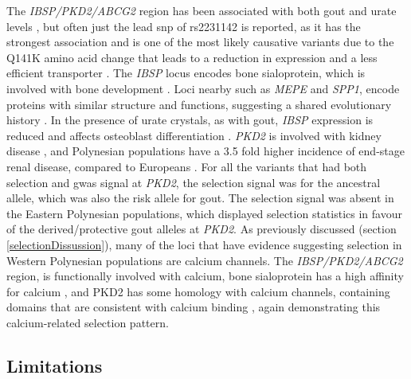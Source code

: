 \documentclass[twoside,openright]{report}
\begin{document}
The \emph{IBSP/PKD2/ABCG2} region has been associated with both gout and
urate levels \citep{Yang2010}, but often just the lead \gls{snp} of
rs2231142 is reported, as it has the strongest association and is one of
the most likely causative variants due to the Q141K amino acid change
that leads to a reduction in expression and a less efficient transporter
\citep{Woodward2009}. The \emph{IBSP} locus encodes bone sialoprotein,
which is involved with bone development \citep{Kerr1993}. Loci nearby
such as \emph{MEPE} and \emph{SPP1}, encode proteins with similar
structure and functions, suggesting a shared evolutionary history
\citep{Rowe2000}. In the presence of urate crystals, as with gout,
\emph{IBSP} expression is reduced and affects osteoblast differentiation
\citep{Chhana2011}. \emph{PKD2} is involved with kidney disease
\citep{Mochizuki1996, Hildebrandt2010}, and Polynesian populations have
a 3.5 fold higher incidence of end-stage renal disease, compared to
Europeans \citep{Collins2017book}. For all the variants that had both
selection and \gls{gwas} signal at \emph{PKD2}, the selection signal was
for the ancestral allele, which was also the risk allele for gout. The
selection signal was absent in the Eastern Polynesian populations, which
displayed selection statistics in favour of the derived/protective gout
alleles at \emph{PKD2}. As previously discussed (section
\ref{selectionDissussion}), many of the loci that have evidence
suggesting selection in Western Polynesian populations are calcium
channels. The \emph{IBSP/PKD2/ABCG2} region, is functionally involved
with calcium, bone sialoprotein has a high affinity for calcium
\citep{Kerr1993}, and PKD2 has some homology with calcium channels,
containing domains that are consistent with calcium binding
\citep{Mochizuki1996}, again demonstrating this calcium-related
selection pattern.

\subsection{Limitations}\label{limitations}
\end{document}
